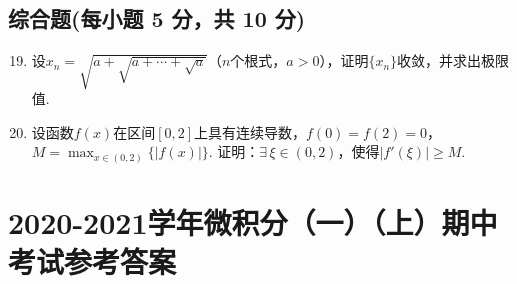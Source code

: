 \documentclass[../main.tex]{subfiles}
\begin{document}
\section{综合题(每小题 5 分，共 10 分)}
\begin{enumerate}
    \setcounter{enumi}{18}
    \item 设$x_{n}=\sqrt{a+\sqrt{a+\cdots+\sqrt{a}}}$（$n$个根式，$a>0$），证明$\{
              x_{n}\}$收敛，并求出极限值.
          \vspace{18em}

    \item 设函数$f(x)$在区间$[0,2]$上具有连续导数，$f(0)=f(2)=0$，$M=\max_{x\in(0,2)}
              \{|f(x)|\}$. 证明：$\exists\,\xi\in(0,2)$，使得$|f'(\xi)|\geq M$.
\end{enumerate}

\chapter{2020-2021学年微积分（一）（上）期中考试参考答案}
\end{document}
